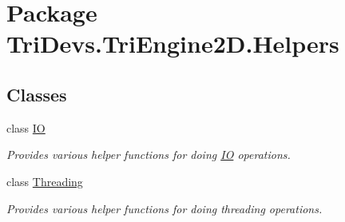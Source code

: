 \hypertarget{namespace_tri_devs_1_1_tri_engine2_d_1_1_helpers}{\section{Package Tri\-Devs.\-Tri\-Engine2\-D.\-Helpers}
\label{namespace_tri_devs_1_1_tri_engine2_d_1_1_helpers}
}
\subsection*{Classes}
\begin{DoxyCompactItemize}
\item 
class \hyperlink{class_tri_devs_1_1_tri_engine2_d_1_1_helpers_1_1_i_o}{I\-O}
\begin{DoxyCompactList}\small\item\em Provides various helper functions for doing \hyperlink{class_tri_devs_1_1_tri_engine2_d_1_1_helpers_1_1_i_o}{I\-O} operations. \end{DoxyCompactList}\item 
class \hyperlink{class_tri_devs_1_1_tri_engine2_d_1_1_helpers_1_1_threading}{Threading}
\begin{DoxyCompactList}\small\item\em Provides various helper functions for doing threading operations. \end{DoxyCompactList}\end{DoxyCompactItemize}
